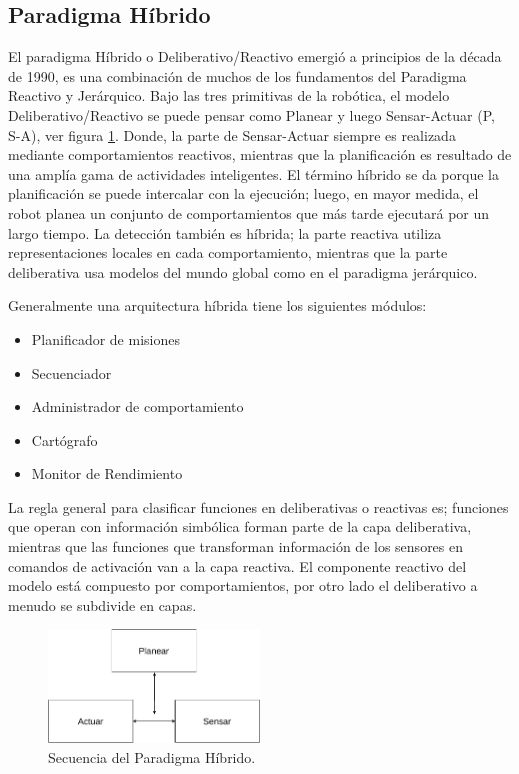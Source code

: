 \subsection{Paradigma Híbrido} \label{sub:paradigma_híbrido}

El paradigma Híbrido o Deliberativo/Reactivo emergió a principios de la década de 1990, es una combinación de muchos de los fundamentos del Paradigma Reactivo y Jerárquico. Bajo las tres primitivas de la robótica, el modelo Deliberativo/Reactivo se puede pensar como Planear y luego Sensar-Actuar (P, S-A), ver figura \ref{fig:hybrid_paradigm}. Donde, la parte de Sensar-Actuar siempre es realizada mediante comportamientos reactivos, mientras que la planificación es resultado de una amplía gama de actividades inteligentes. El término híbrido se da porque la planificación se puede intercalar con la ejecución; luego, en mayor medida, el robot planea un conjunto de comportamientos que más tarde ejecutará por un largo tiempo. La detección también es híbrida; la parte reactiva utiliza representaciones locales en cada comportamiento, mientras que la parte deliberativa usa modelos del mundo global como en el paradigma jerárquico.

Generalmente una arquitectura híbrida tiene los siguientes módulos:
\begin{itemize}
    \item Planificador de misiones
    \item Secuenciador
    \item Administrador de comportamiento
    \item Cartógrafo
    \item Monitor de Rendimiento
\end{itemize}

La regla general para clasificar funciones en deliberativas o reactivas es; funciones que operan con información simbólica forman parte de la capa deliberativa, mientras que las funciones que transforman información de los sensores en comandos de activación van a la capa reactiva. El componente reactivo del modelo está compuesto por comportamientos, por otro lado el deliberativo a menudo se subdivide en capas.
\begin{figure}[h]
    \centering
    \includegraphics[width=0.5\textwidth]{Figures/Figures_Cap06/hybrid_paradigm.pdf}
    \caption{Secuencia del Paradigma Híbrido.}
    \label{fig:hybrid_paradigm}
\end{figure}

